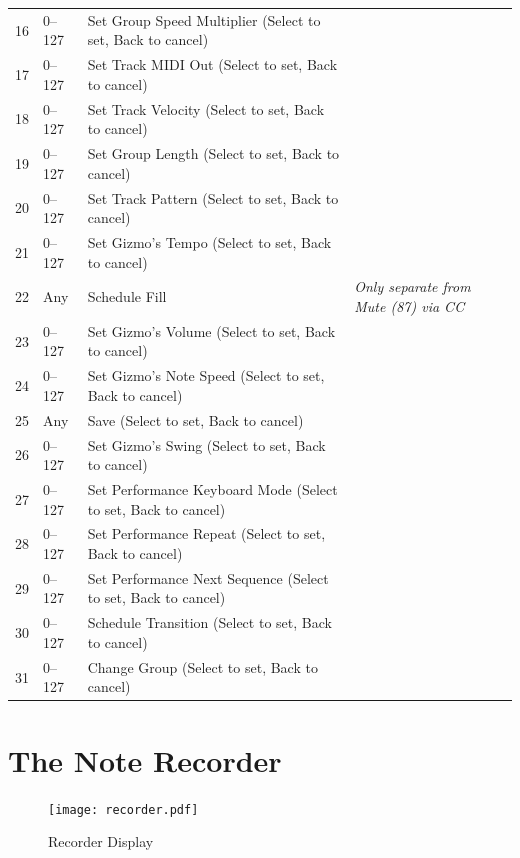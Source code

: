 \documentclass{article}
\begin{document}
{\begin{tabular}{@{}rll@{}l@{}}
16	&	0--127		& Set Group Speed Multiplier (Select to set, Back to cancel)\\
17	&	0--127		& Set Track MIDI Out (Select to set, Back to cancel)\\
18	&	0--127		& Set Track Velocity (Select to set, Back to cancel)\\
19	&	0--127		& Set Group Length (Select to set, Back to cancel)\\
20	&	0--127		& Set Track Pattern (Select to set, Back to cancel)\\
21	&	0--127		& Set Gizmo's Tempo (Select to set, Back to cancel)\\
22	&	Any		& Schedule Fill&{\it Only separate from Mute (87) via CC}\\
23	&	0--127		& Set Gizmo's Volume (Select to set, Back to cancel)\\
24	&	0--127		& Set Gizmo's Note Speed (Select to set, Back to cancel)\\
25	&	Any		& Save (Select to set, Back to cancel)\\
26	&	0--127		& Set Gizmo's Swing (Select to set, Back to cancel)\\
27	&	0--127		& Set Performance Keyboard Mode (Select to set, Back to cancel)\\
28	&	0--127		& Set Performance Repeat (Select to set, Back to cancel)\\
29	&	0--127		& Set Performance Next Sequence (Select to set, Back to cancel)\\
30	&	0--127		& Schedule Transition (Select to set, Back to cancel)\\
31	&	0--127		& Change Group (Select to set, Back to cancel)\\
\end{tabular}
}

\clearpage

\section {The Note Recorder}

\begin{figure}
\vspace{-1.5em}\texttt{[image: recorder.pdf]}
\vspace{-2em}\caption{\small Recorder Display}\vspace{-1em}
\label{recorder}
\end{figure}
\end{document}
